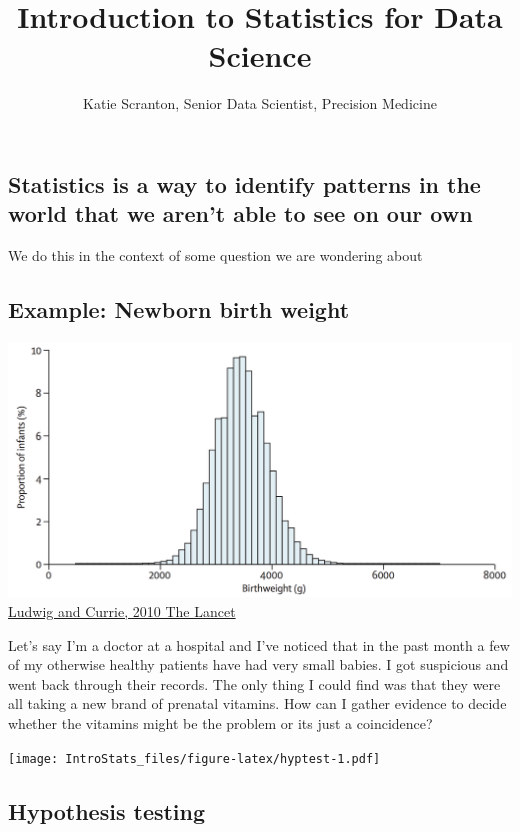 \documentclass[]{article}
\title{Introduction to Statistics for Data Science}
\author{Katie Scranton, Senior Data Scientist, Precision Medicine}
\date{}
\begin{document}
\maketitle

\subsection{Statistics is a way to identify patterns in the world that
we aren't able to see on our
own}\label{statistics-is-a-way-to-identify-patterns-in-the-world-that-we-arent-able-to-see-on-our-own}

We do this in the context of some question we are wondering about

\subsection{Example: Newborn birth
weight}\label{example-newborn-birth-weight}

\includegraphics{images/lancet.png}
\href{https://www.thelancet.com/journals/lancet/article/PIIS0140-6736(10)60751-9/fulltext}{Ludwig
and Currie, 2010 The Lancet}

Let's say I'm a doctor at a hospital and I've noticed that in the past
month a few of my otherwise healthy patients have had very small babies.
I got suspicious and went back through their records. The only thing I
could find was that they were all taking a new brand of prenatal
vitamins. How can I gather evidence to decide whether the vitamins might
be the problem or its just a coincidence?

\texttt{[image: IntroStats\_files/figure-latex/hyptest-1.pdf]}

\subsection{Hypothesis testing}\label{hypothesis-testing}
\end{document}
